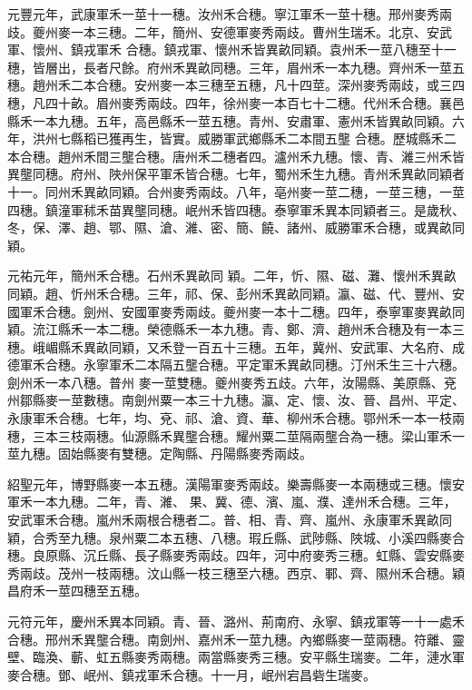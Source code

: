 \begin{pinyinscope}
 元豐元年，武康軍禾一莖十一穗。汝州禾合穗。寧江軍禾一莖十穗。邢州麥秀兩歧。夔州麥一本三穗。二年，簡州、安德軍麥秀兩歧。曹州生瑞禾。北京、安武軍、懷州、鎮戎軍禾
 合穗。鎮戎軍、懷州禾皆異畝同穎。袁州禾一莖八穗至十一穗，皆層出，長者尺餘。府州禾異畝同穗。三年，眉州禾一本九穗。齊州禾一莖五穗。趙州禾二本合穗。安州麥一本三穗至五穗，凡十四莖。深州麥秀兩歧，或三四穗，凡四十畝。眉州麥秀兩歧。四年，徐州麥一本百七十二穗。代州禾合穗。襄邑縣禾一本九穗。五年，高邑縣禾一莖五穗。青州、安肅軍、憲州禾皆異畝同穎。六年，洪州七縣稻已獲再生，皆實。威勝軍武鄉縣禾二本間五壟
 合穗。歷城縣禾二本合穗。趙州禾間三壟合穗。唐州禾二穗者四。瀘州禾九穗。懷、青、濰三州禾皆異壟同穗。府州、陜州保平軍禾皆合穗。七年，蜀州禾生九穗。青州禾異畝同穎者十一。同州禾異畝同穎。合州麥秀兩歧。八年，亳州麥一莖二穗，一莖三穗，一莖四穗。鎮潼軍秫禾苗異壟同穗。岷州禾皆四穗。泰寧軍禾異本同穎者三。是歲秋、冬，保、澤、趙、鄂、隰、滄、濰、密、簡、饒、諸州、威勝軍禾合穗，或異畝同穎。



 元祐元年，簡州禾合穗。石州禾異畝同
 穎。二年，忻、隰、磁、灘、懷州禾異畝同穎。趙、忻州禾合穗。三年，祁、保、彭州禾異畝同穎。瀛、磁、代、豐州、安國軍禾合穗。劍州、安國軍麥秀兩歧。夔州麥一本十二穗。四年，泰寧軍麥異畝同穎。流江縣禾一本二穗。榮德縣禾一本九穗。青、鄭、濟、趙州禾合穗及有一本三穗。峨嵋縣禾異畝同穎，又禾登一百五十三穗。五年，冀州、安武軍、大名府、成德軍禾合穗。永寧軍禾二本隔五壟合穗。平定軍禾異畝同穗。汀州禾生三十六穗。劍州禾一本八穗。普州
 麥一莖雙穗。夔州麥秀五歧。六年，汝陽縣、美原縣、兗州鄒縣麥一莖數穗。南劍州粟一本三十九穗。瀛、定、懷、汝、晉、昌州、平定、永康軍禾合穗。七年，均、兗、祁、滄、資、華、柳州禾合穗。鄂州禾一本一枝兩穗，三本三枝兩穗。仙源縣禾異壟合穗。耀州粟二莖隔兩壟合為一穗。梁山軍禾一莖九穗。固始縣麥有雙穗。定陶縣、丹陽縣麥秀兩歧。



 紹聖元年，博野縣麥一本五穗。漢陽軍麥秀兩歧。樂壽縣麥一本兩穗或三穗。懷安軍禾一本九穗。二年，青、濰、
 果、冀、德、濱、嵐、濮、達州禾合穗。三年，安武軍禾合穗。嵐州禾兩根合穗者二。普、相、青、齊、嵐州、永康軍禾異畝同穎，合秀至九穗。泉州粟二本五穗、八穗。瑕丘縣、武陟縣、陜城、小溪四縣麥合穗。良原縣、沉丘縣、長子縣麥秀兩歧。四年，河中府麥秀三穗。虹縣、雲安縣麥秀兩歧。茂州一枝兩穗。汶山縣一枝三穗至六穗。西京、鄆、齊、隰州禾合穗。穎昌府禾一莖四穗至五穗。



 元符元年，慶州禾異本同穎。青、晉、潞州、荊南府、永寧、鎮戎軍等一十一處禾
 合穗。邢州禾異壟合穗。南劍州、嘉州禾一莖九穗。內鄉縣麥一莖兩穗。符離、靈壁、臨渙、蘄、虹五縣麥秀兩穗。兩當縣麥秀三穗。安平縣生瑞麥。二年，漣水軍麥合穗。鄧、岷州、鎮戎軍禾合穗。十一月，岷州宕昌砦生瑞麥。




\end{pinyinscope}

